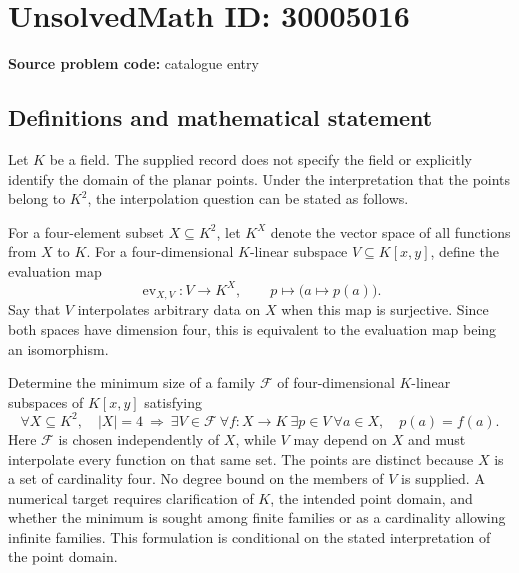 \documentclass[11pt]{article}
\begin{document}
\section*{UnsolvedMath ID: 30005016}
\textbf{Source problem code:} catalogue entry
\subsection{Definitions and mathematical statement}
Let \(K\) be a field. The supplied record does not specify the field or explicitly identify the domain of the planar points. Under the interpretation that the points belong to \(K^2\), the interpolation question can be stated as follows.

For a four-element subset \(X\subseteq K^2\), let \(K^X\) denote the vector space of all functions from \(X\) to \(K\). For a four-dimensional \(K\)-linear subspace \(V\subseteq K[x,y]\), define the evaluation map
\[
\operatorname{ev}_{X,V}:V\longrightarrow K^X,
\qquad p\longmapsto \bigl(a\mapsto p(a)\bigr).
\]
Say that \(V\) interpolates arbitrary data on \(X\) when this map is surjective. Since both spaces have dimension four, this is equivalent to the evaluation map being an isomorphism.

Determine the minimum size of a family \(\mathcal F\) of four-dimensional \(K\)-linear subspaces of \(K[x,y]\) satisfying
\[
\forall X\subseteq K^2,\quad |X|=4
\ \Longrightarrow\ 
\exists V\in\mathcal F\ \forall f:X\to K\ \exists p\in V\ 
\forall a\in X,\quad p(a)=f(a).
\]
Here \(\mathcal F\) is chosen independently of \(X\), while \(V\) may depend on \(X\) and must interpolate every function on that same set. The points are distinct because \(X\) is a set of cardinality four. No degree bound on the members of \(V\) is supplied. A numerical target requires clarification of \(K\), the intended point domain, and whether the minimum is sought among finite families or as a cardinality allowing infinite families. This formulation is conditional on the stated interpretation of the point domain.
\end{document}

